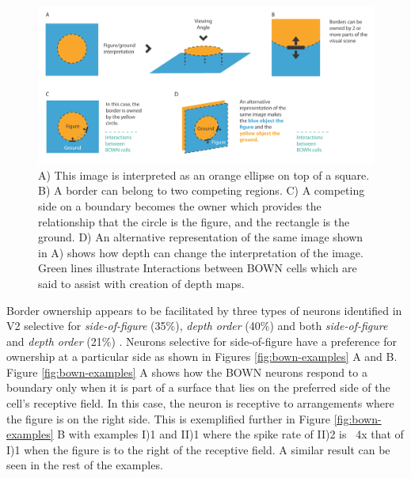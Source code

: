 \begin{figure}[t!]
\centering
\includegraphics[width=\textwidth]{images/related-work/border-ownership}
\caption{A) This image is interpreted as an orange ellipse on top of a square.
B) A border can belong to two competing regions.
C) A competing side on a boundary becomes the owner which provides the relationship that the circle is the figure, and the rectangle is the ground.
D) An alternative representation of the same image shown in A) shows how depth can change the interpretation of the image.
Green lines illustrate Interactions between BOWN cells which are said to assist with creation of depth maps.}
\label{fig:bown}
\end{figure}

Border ownership appears to be facilitated by three types of neurons identified in V2 \cite{zhou2000coding, qiu2005figure} selective for \emph{side-of-figure} (35\%), \emph{depth order} (40\%) and both \emph{side-of-figure} and \emph{depth order} (21\%) \cite{qiu2005figure}. 
Neurons selective for side-of-figure have a preference for ownership at a particular side as shown in Figures \ref{fig:bown-examples} A and B. 
Figure \ref{fig:bown-examples} A shows how the BOWN neurons respond to a boundary only when it is part of a surface that lies on the preferred side of the cell's receptive field. 
In this case, the neuron is receptive to arrangements where the figure is on the right side. 
This is exemplified further in Figure \ref{fig:bown-examples} B with examples I)1 and II)1 where the spike rate of II)2 is ~4x that of I)1 when the figure is to the right of the receptive field. 
A similar result can be seen in the rest of the examples.  


